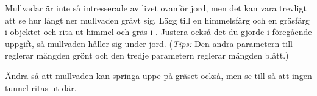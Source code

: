 \Task
Mullvadar är inte så intresserade av livet ovanför jord, men det kan vara trevligt att se hur långt ner mullvaden grävt sig.
Lägg till en himmelsfärg och en gräsfärg i objektet  och rita ut himmel och gräs i .
Justera också det du gjorde i föregående uppgift, så mullvaden håller sig under jord.
(\emph{Tips:} Den andra parametern till  reglerar mängden grönt och den tredje parametern reglerar mängden blått.)

\Task
Ändra så att mullvaden kan springa uppe på gräset också, men se till så att ingen tunnel ritas ut där.
